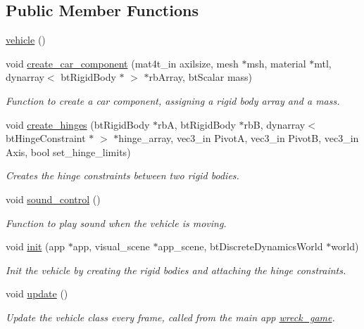 \subsection*{Public Member Functions}
\begin{DoxyCompactItemize}
\item 
\hyperlink{classoctet_1_1vehicle_a22017fec042aa7732f1699b535390787}{vehicle} ()
\item 
void \hyperlink{classoctet_1_1vehicle_aa0d5baefeba0587e62f9c62dc87506fb}{create\+\_\+car\+\_\+component} (mat4t\+\_\+in axilsize, mesh $\ast$msh, material $\ast$mtl, dynarray$<$ bt\+Rigid\+Body $\ast$ $>$ $\ast$rb\+Array, bt\+Scalar mass)
\begin{DoxyCompactList}\small\item\em Function to create a car component, assigning a rigid body array and a mass. \end{DoxyCompactList}\item 
void \hyperlink{classoctet_1_1vehicle_a36bcb4433889025632bfec79f681a877}{create\+\_\+hinges} (bt\+Rigid\+Body $\ast$rb\+A, bt\+Rigid\+Body $\ast$rb\+B, dynarray$<$ bt\+Hinge\+Constraint $\ast$ $>$ $\ast$hinge\+\_\+array, vec3\+\_\+in Pivot\+A, vec3\+\_\+in Pivot\+B, vec3\+\_\+in Axis, bool set\+\_\+hinge\+\_\+limits)
\begin{DoxyCompactList}\small\item\em Creates the hinge constraints between two rigid bodies. \end{DoxyCompactList}\item 
void \hyperlink{classoctet_1_1vehicle_a45b69ee9ab03cf7b1c05dfdb88eb783c}{sound\+\_\+control} ()
\begin{DoxyCompactList}\small\item\em Function to play sound when the vehicle is moving. \end{DoxyCompactList}\item 
void \hyperlink{classoctet_1_1vehicle_af1ecc8cb043d912123287e085dd3417d}{init} (app $\ast$app, visual\+\_\+scene $\ast$app\+\_\+scene, bt\+Discrete\+Dynamics\+World $\ast$world)
\begin{DoxyCompactList}\small\item\em Init the vehicle by creating the rigid bodies and attaching the hinge constraints. \end{DoxyCompactList}\item 
void \hyperlink{classoctet_1_1vehicle_a8c833c3ae603e9ae1355a60fb10a43de}{update} ()
\begin{DoxyCompactList}\small\item\em Update the vehicle class every frame, called from the main app \hyperlink{classoctet_1_1wreck__game}{wreck\+\_\+game}. \end{DoxyCompactList}\item 

\end{DoxyCompactItemize}
